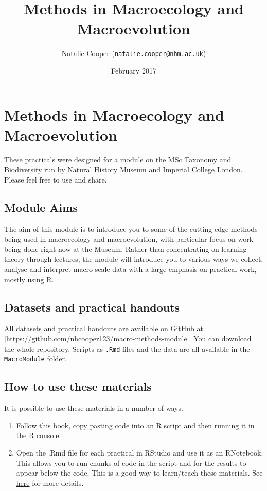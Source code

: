 \documentclass[]{book}
\title{Methods in Macroecology and Macroevolution}
\author{Natalie Cooper
(\href{mailto:natalie.cooper@nhm.ac.uk}{\nolinkurl{natalie.cooper@nhm.ac.uk}})}
\date{February 2017}
\providecommand{\tightlist}{%
  \setlength{\itemsep}{0pt}\setlength{\parskip}{0pt}}
\begin{document}
\maketitle

{
\setcounter{tocdepth}{1}
\tableofcontents
}
\chapter{Methods in Macroecology and
Macroevolution}\label{methods-in-macroecology-and-macroevolution}

These practicals were designed for a module on the MSc Taxonomy and
Biodiversity run by Natural History Museum and Imperial College London.
Please feel free to use and share.

\section{Module Aims}\label{module-aims}

The aim of this module is to introduce you to some of the cutting-edge
methods being used in macroecology and macroevolution, with particular
focus on work being done right now at the Museum. Rather than
concentrating on learning theory through lectures, the module will
introduce you to various ways we collect, analyse and interpret
macro-scale data with a large emphasis on practical work, mostly using
R.

\section{Datasets and practical
handouts}\label{datasets-and-practical-handouts}

All datasets and practical handouts are available on GitHub at
{[}\url{https://github.com/nhcooper123/macro-methods-module}{]}. You can
download the whole repository. Scripts as \texttt{.Rmd} files and the
data are all available in the \texttt{MacroModule} folder.

\section{How to use these materials}\label{how-to-use-these-materials}

It is possible to use these materials in a number of ways.

\begin{enumerate}
\def\labelenumi{\arabic{enumi}.}
\tightlist
\item
  Follow this book, copy pasting code into an R script and then running
  it in the R console.
\item
  Open the .Rmd file for each practical in RStudio and use it as an
  RNotebook. This allows you to run chunks of code in the script and for
  the results to appear below the code. This is a good way to
  learn/teach these materials. See
  \href{http://rmarkdown.rstudio.com/r_notebooks.html}{here} for more
  details.
\end{enumerate}
\end{document}
